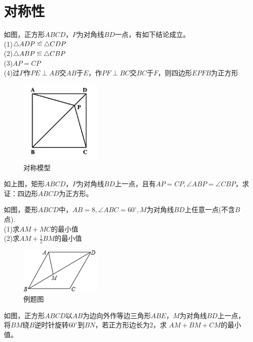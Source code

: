\documentclass{ecnuthesis}
\newcommand\backcong{\mathrel{\reflectbox{$\cong$}}}
\begin{document}
\section{对称性}
\begin{model}
    如图，正方形$ABCD$，$P$为对角线$BD$一点，有如下结论成立。\\
    (1)$\triangle ADP \backcong \triangle CDP$ \\
    (2)$\triangle ABP \backcong \triangle CBP$ \\
    (3)$AP=CP$ \\
    (4)过$P$作$PE\perp AB$交$AB$于$E$，作$PF\perp BC$交$BC$于$F$，则四边形$EPFB$为正方形 \\
\end{model}
\begin{figure}[H]
\centering
\includegraphics[width=4cm]{picture/652.png}
\caption{对称模型}
\end{figure}
\begin{problem}
    如上图，矩形$ABCD$，$P$为对角线$BD$上一点，且有$AP=CP,\angle ABP=\angle CBP$，求证：四边形$ABCD$为正方形。
\end{problem}
\begin{example}
    如图，菱形$ABCD$中，$AB=8,\angle ABC=60^\circ,M$为对角线$BD$上任意一点(不含$B$点). \\
    (1)求$AM+MC$的最小值 \\
    (2)求$AM+\frac{1}{2}BM$的最小值 \\
\end{example}
\begin{figure}[H]
\centering
\includegraphics[width=4cm]{picture/611.png}
\caption{例题图}
\end{figure}
\begin{example}
    如图，正方形$ABCD$以$AB$为边向外作等边三角形$ABE$，$M$为对角线$BD$上一点，将$BM$绕$B$逆时针旋转$60^\circ$到$BN$，若正方形边长为2，求
    $AM+BM+CM$的最小值。
\end{example}
\end{document}
